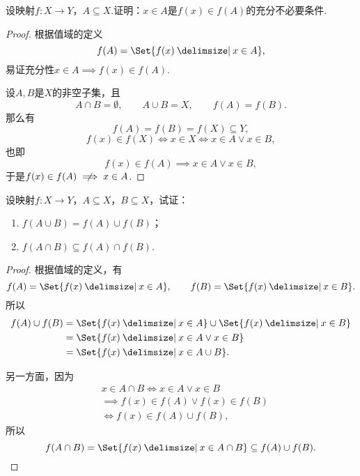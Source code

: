 \begin{example}
设映射\(f\colon X \to Y\)，\(A \subseteq X\).证明：\(x \in A\)是\(f(x) \in f(A)\)的充分不必要条件.
\begin{proof}
根据值域的定义\[
f(A) = \Set{ f(x) \given x \in A },
\]易证充分性\(x \in A \implies f(x) \in f(A)\).

设\(A,B\)是\(X\)的非空子集，且\[
A \cap B = \emptyset,
\qquad
A \cup B = X,
\qquad
f(A) = f(B).
\]那么有\[
f(A) = f(B) = f(X) \subseteq Y,
\]\[
f(x) \in f(X) \iff x \in X \iff x \in A \lor x \in B,
\]也即\[
f(x) \in f(A) \implies x \in A \lor x \in B,
\]于是\(f(x) \in f(A) \notimplies x \in A\).
\end{proof}
\end{example}

\begin{example}
设映射\(f\colon X \to Y\)，\(A \subseteq X\)，\(B \subseteq X\)，试证：\begin{enumerate}
\item \(f(A \cup B) = f(A) \cup f(B)\)；
\item \(f(A \cap B) \subseteq f(A) \cap f(B)\).
\end{enumerate}
\begin{proof}
\def\fran#1{ \Set{ f(x) \given #1 } }
根据值域的定义，有\[
f(A) = \fran{x \in A},
\qquad
f(B) = \fran{x \in B}.
\]所以\[
\begin{split}
f(A) \cup f(B)
&= \fran{x \in A} \cup \fran{x \in B} \\
&= \fran{x \in A \lor x \in B} \\
&= \fran{x \in A \cup B}.
\end{split}
\]

另一方面，因为\[
\begin{split}
&x \in A \cap B
\iff
x \in A \lor x \in B \\
&\implies
f(x) \in f(A) \lor f(x) \in f(B) \\
&\iff
f(x) \in f(A) \cup f(B),
\end{split}
\]所以\[
f(A \cap B) = \fran{x \in A \cap B}
\subseteq f(A) \cup f(B).
\qedhere
\]
\end{proof}
\end{example}

